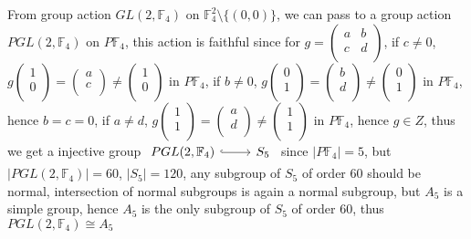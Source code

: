 \documentclass[10pt]{article}
\newcommand{\<}[1]{\langle #1 \rangle}
\begin{document}
From group action $GL(2,\mathbb{F}_4)$ on $\mathbb{F}_4^2\setminus\{(0,0)\}$, we can pass to a group action $PGL(2,\mathbb{F}_4)$ on $P\mathbb{F}_4$, this action is faithful since for $g=\left( {\begin{array}{cc}
   a & b \\
   c & d \\
  \end{array} } \right)$, if $c\neq0$, $g\left( {\begin{array}{c}
   1 \\
   0 \\
  \end{array} } \right)=\left( {\begin{array}{c}
   a \\
   c \\
  \end{array} } \right)\neq\left( {\begin{array}{c}
   1 \\
   0 \\
  \end{array} } \right)$ in $P\mathbb{F}_4$, if $b\neq0$,  $g\left( {\begin{array}{c}
   0 \\
   1 \\
  \end{array} } \right)=\left( {\begin{array}{c}
   b \\
   d \\
  \end{array} } \right)\neq\left( {\begin{array}{c}
   0 \\
   1 \\
  \end{array} } \right)$ in $P\mathbb{F}_4$, hence $b=c=0$, if $a\neq d$,  $g\left( {\begin{array}{c}
   1 \\
   1 \\
  \end{array} } \right)=\left( {\begin{array}{c}
   a \\
   d \\
  \end{array} } \right)\neq\left( {\begin{array}{c}
   1 \\
   1 \\
  \end{array} } \right)$ in $P\mathbb{F}_4$, hence $g\in Z$, thus we get a injective group $\begin{tikzcd}
{PGL(2,\mathbb{F}_4)} \arrow[r, hook] & S_5
\end{tikzcd}$ since $|P\mathbb{F}_4|=5$, but $|PGL(2,\mathbb{F}_4)|=60$, $|S_5|=120$, any subgroup of $S_5$ of order $60$ should be normal, intersection of normal subgroups is again a normal subgroup, but $A_5$ is a simple group, hence $A_5$ is the only subgroup of $S_5$ of order $60$, thus $PGL(2,\mathbb{F}_4)\cong A_5$ \par
\end{document}
